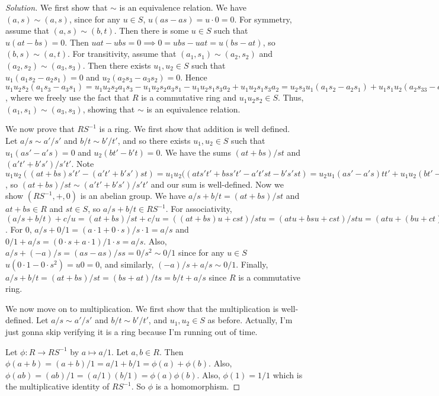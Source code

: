 \documentclass{article}
\begin{document}
\begin{proof}[Solution]\let\qed\relax
	We first show that $\sim$ is an equivalence relation.
	We have $(a,s) \sim (a,s)$, since for any $u \in S$,
	$u(as - as) = u\cdot 0 = 0$.
	For symmetry, assume that $(a,s) \sim (b,t)$.
	Then there is some $u \in S$ such that $u(at-bs) = 0$.
	Then $uat - ubs = 0 \implies 0 = ubs - uat = u(bs - at)$,
	so $(b,s) \sim (a,t)$.
	For transitivity, assume that $(a_1,s_1) \sim (a_2,s_2)$
	and $(a_2,s_2) \sim (a_3,s_3)$.
	Then there exists $u_1,u_2 \in S$ such that
	$u_1(a_1s_2 - a_2s_1) = 0$ and $u_2(a_2s_3 - a_3s_2) = 0$.
	Hence $u_1u_2s_2(a_1s_3 - a_3s_1) =
	u_1u_2s_2a_1s_3 - u_1u_2s_2a_3s_1 - u_1u_2s_1s_3a_2 + u_1u_2s_1s_3a_2
	= u_2s_3u_1(a_1s_2 - a_2s_1) + u_1s_1u_2(a_2s_33 - a_3s_2)
	= u_2s_3\cdot 0  + u_1s_1\cdot0 = 0$,
	where we freely use the fact that $R$ is a commutative ring
	and $u_1u_2s_2 \in S$.
	Thus, $(a_1,s_1) \sim (a_3,s_3)$,
	showing that $\sim$ is an equivalence relation.

	We now prove that $RS^{-1}$ is a ring.
	We first show that addition is well defined.
	Let $a/s \sim a'/s'$ and $b/t \sim b'/t'$,
	and so there exists $u_1,u_2 \in S$ such that
	$u_1(as' - a's) = 0$ and $u_2(bt' - b't) = 0$.
	We have the sums $(at+bs)/st$ and $(a't' + b's')/s't'$.
	Note $u_1u_2((at+bs)s't' - (a't' + b's')st) =
	u_1u_2((ats't'+bss't' - a't'st - b's'st)
	=u_2u_1(as' - a's)tt' + u_1u_2(bt' - b't)ss' = 0 + 0 = 0$,
	so $(at+bs)/st \sim (a't' + b's')/s't'$ and our sum is well-defined.
	Now we show $(RS^{-1},+,0)$ is an abelian group.
	We have $a/s + b/t = (at+bs)/st$ and $at+bs \in R$ and $st\in S$,
	so $a/s + b/t \in RS^{-1}$.
	For associativity, $(a/s + b/t) + c/u = (at+bs)/st + c/u
	= ((at+bs)u + cst)/stu = (atu + bsu + cst)/stu
	= (atu + (bu + ct)s)/stu = a/s + (b/t + c/u)$.
	For $0$, $a/s + 0/1 = (a\cdot1 + 0\cdot s)/s\cdot1 = a/s$
	and $0/1 + a/s = (0\cdot s + a\cdot 1)/1\cdot s = a/s$.
	Also, $a/s + (-a)/s = (as - as)/ss = 0/s^2 \sim 0/1$
	since for any $u \in S$ $u(0\cdot 1 - 0\cdot s^2) = u0 = 0$,
	and similarly, $(-a)/s + a/s \sim 0/1$.
	Finally, $a/s + b/t = (at + bs)/st = (bs + at)/ts = b/t + a/s$
	since $R$ is a commutative ring.

	We now move on to multiplication.
	We first show that the multiplication is well-defined.
	Let $a/s \sim a'/s'$ and $b/t \sim b'/t'$, and $u_1,u_2 \in S$
	as before.
	Actually, I'm just gonna skip verifying it is a ring because I'm running out of time.

	Let $\phi \colon R \to RS^{-1}$ by $a \mapsto a/1$.
	Let $a,b \in R$.
	Then $\phi(a + b) = (a+b)/1 = a/1 + b/1 = \phi(a) + \phi(b)$.
	Also, $\phi(ab) = (ab)/1 = (a/1)(b/1) = \phi(a)\phi(b)$.
	Also, $\phi(1) = 1/1$ which is the multiplicative identity of $RS^{-1}$.
	So $\phi$ is a homomorphism.
	

\end{proof}
\end{document}
